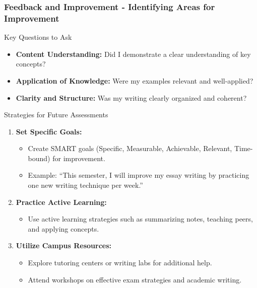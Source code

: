 \documentclass[aspectratio=169]{beamer}
\begin{document}
\begin{frame}[fragile]
    \frametitle{Feedback and Improvement - Identifying Areas for Improvement}
    \begin{block}{Key Questions to Ask}
        \begin{itemize}
            \item \textbf{Content Understanding:} Did I demonstrate a clear understanding of key concepts?
            \item \textbf{Application of Knowledge:} Were my examples relevant and well-applied?
            \item \textbf{Clarity and Structure:} Was my writing clearly organized and coherent?
        \end{itemize}
    \end{block}

    \begin{block}{Strategies for Future Assessments}
        \begin{enumerate}
            \item \textbf{Set Specific Goals:}
            \begin{itemize}
                \item Create SMART goals (Specific, Measurable, Achievable, Relevant, Time-bound) for improvement.
                \item Example: “This semester, I will improve my essay writing by practicing one new writing technique per week.”
            \end{itemize}
            \item \textbf{Practice Active Learning:}
            \begin{itemize}
                \item Use active learning strategies such as summarizing notes, teaching peers, and applying concepts.
            \end{itemize}
            \item \textbf{Utilize Campus Resources:}
            \begin{itemize}
                \item Explore tutoring centers or writing labs for additional help.
                \item Attend workshops on effective exam strategies and academic writing.
            \end{itemize}
        \end{enumerate}
    \end{block}
\end{frame}
\end{document}
